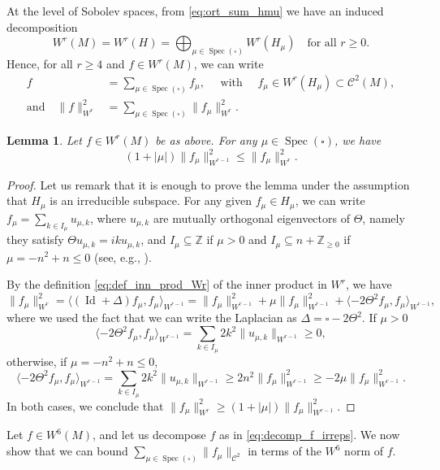 \documentclass[JEP,XML,SOM,NoEqCountersInSection,Unicode,published]{cedram}
\newcommand \Z{\mathbb{Z}}
\DeclareMathOperator{\Spec}{Spec}
\DeclareMathOperator{\Id}{Id}
\newtheorem {lemma}[theorem]{Lemma}
\theoremstyle{definition}
\begin{document}
At the level of Sobolev spaces, from \eqref{eq:ort_sum_hmu} we have an induced decomposition
\[
W^r(M) = W^r(H) = \bigoplus_{\mu \in \Spec(\square)} W^r(H_{\mu}) \quad \text{for all $r \geq 0$}.
\]
Hence, for all $r \geq 4$ and $f \in W^r(M)$, we can write
\begin{equation}\label{eq:decomp_f_irreps}
\begin{split}
f &= \sum_{\mu \in \Spec(\square)} f_\mu, \quad \text{ with } \quad f_\mu \in W^r(H_{\mu}) \subset \mathscr{C}^2(M), \\
\text{and} \quad \|f\|^2_{W^r} &= \sum_{\mu \in \Spec(\square)} \|f_\mu\|^2_{W^r}.
\end{split}
\end{equation}

\begin{lemma}\label{lemma:w4_to_w6}
Let $f \in W^r(M)$ be as above. For any $\mu \in \Spec(\square)$, we have
\[
(1+|\mu|) \|f_\mu\|^2_{W^{r-1}} \leq \|f_\mu\|^2_{W^r}.
\]
\end{lemma}
\begin{proof}
Let us remark that it is enough to prove the lemma under the assumption that $H_\mu$ is an irreducible subspace.
For any given $f_\mu \in H_\mu$, we can write $f_\mu = \sum_{k \in I_\mu} u_{\mu, k}$, where $u_{\mu, k}$ are mutually orthogonal eigenvectors of $\Theta$, namely they satisfy $\Theta u_{\mu, k} = iku_{\mu, k}$, and $I_\mu \subseteq \Z$ if $\mu >0$ and $I_\mu \subseteq n+ \Z_{\geq 0}$ if $\mu = -n^2+n \leq 0$ (see, e.g., \cite[\S2]{FlaFo}).

By the definition \eqref{eq:def_inn_prod_Wr} of the inner product in $W^r$, we have
\[
\|f_\mu\|^2_{W^r} = \langle (\Id+\Delta) f_\mu, f_\mu \rangle_{W^{r-1}} = \|f_\mu\|^2_{W^{r-1}} + \mu \|f_\mu\|^2_{W^{r-1}} + \langle -2\Theta^2 f_\mu, f_\mu \rangle_{W^{r-1}},
\]
where we used the fact that we can write the Laplacian as $\Delta = \square - 2 \Theta^2$.
If $\mu >0$
\[
\langle -2\Theta^2 f_\mu, f_\mu \rangle_{W^{r-1}} = \sum_{k \in I_\mu} 2k^2 \|u_{\mu, k}\|_{W^{r-1}} \geq 0,
\]
otherwise, if $\mu = -n^2+n \leq 0$,
\[
\langle -2\Theta^2 f_\mu, f_\mu \rangle_{W^{r-1}} = \sum_{k \in I_\mu} 2k^2 \|u_{\mu, k}\|_{W^{r-1}} \geq 2n^2 \|f_\mu\|^2_{W^{r-1}}\geq -2\mu \|f_\mu\|^2_{W^{r-1}}.
\]
In both cases, we conclude that $\|f_\mu\|^2_{W^r} \geq (1+|\mu|)\|f_\mu\|^2_{W^{r-1}}$.
\end{proof}

Let $f \in W^6(M)$, and let us decompose $f$ as in \eqref{eq:decomp_f_irreps}. We now show that we can bound $\sum_{\mu \in \Spec(\square)} \|f_\mu\|_{\mathscr{C}^2}$ in terms of the $W^6$ norm of $f$.
\end{document}
